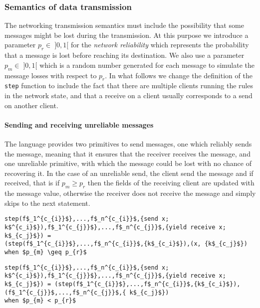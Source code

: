 \subsubsection{Semantics of data transmission} The networking transmission semantics must include the possibility that some messages might be lost during the transmission. At this purpose we introduce a parameter $p_{r} \in \; ]0,1[$ for the \textit{network reliability} which represents the probability that a message is lost before reaching its destination. We also use a parameter $p_{m} \in \; ]0,1[$ which is a random number generated for each message to simulate the message losses with respect to $p_{r}$. In what follows we change the definition of the \texttt{step} function to include the fact that there are multiple clients running the rules in the network state, and that a receive on a client usually corresponds to a send on another client.

\paragraph{Sending and receiving unreliable messages} The language provides two primitives to send messages, one which reliably sends the message, meaning that it ensures that the receiver receives the message, and one unreliable primitive, with which the message could be lost with no chance of recovering it. In the case of an unreliable send, the client send the message and if received, that is if $p_{m} \geq p_{r}$ then the fields of the receiving client are updated with the message value, otherwise the receiver does not receive the message and simply skips to the next statement.

\begin{lstlisting}[mathescape = true]
step(f$_1^{c_{i}}$},...,f$_n^{c_{i}}$,{send x; k$^{c_i}$}),f$_1^{c_{j}}$},...,f$_n^{c_{j}}$,{yield receive x; k$_{c_j}$}) =
(step(f$_1^{c_{i}}$},...,f$_n^{c_{i}}$,{k$_{c_i}$}),(x, {k$_{c_j}$})
when $p_{m} \geq p_{r}$
\end{lstlisting}

\begin{lstlisting}[mathescape = true]
step(f$_1^{c_{i}}$},...,f$_n^{c_{i}}$,{send x; k$^{c_i}$}),f$_1^{c_{j}}$},...,f$_n^{c_{j}}$,{yield receive x; k$_{c_j}$}) = (step(f$_1^{c_{i}}$},...,f$_n^{c_{i}}$,{k$_{c_i}$}),(f$_1^{c_{j}}$,...,f$_n^{c_{j}}$,{ k$_{c_j}$})
when $p_{m} < p_{r}$
\end{lstlisting}


